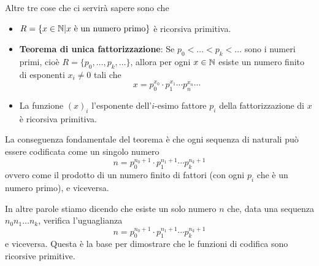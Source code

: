 Altre tre cose che ci servirà sapere sono che
\begin{itemize}
	\item $R = \{ x \in \mathbb{N} | x \text{ è un numero primo} \}$
	      è ricorsiva primitiva.
	\item \textbf{Teorema di unica fattorizzazione}: Se
	      $p_0 < \dots < p_k < \dots$ sono i numeri primi,
	      cioè $R = \{ p_0, \dots, p_k, \dots \}$, allora per
	      ogni $x \in \mathbb{N}$ esiste un numero finito di esponenti
	      $x_i \neq 0$ tali che
	      \[
		      x = p_0^{x_0} \cdot p_1^{x_1} \cdots
		      p_n^{x_n} \cdots
	      \]
	\item La funzione $(x)_i$ l'esponente dell'$i$-esimo
	      fattore $p_i$ della fattorizzazione di $x$ è
	      ricorsiva primitiva.
\end{itemize}
La conseguenza fondamentale del teorema è che ogni sequenza
di naturali può essere codificata come un singolo numero
\[
	n = p_0^{n_0 + 1} \cdot p_1^{n_1 + 1} \cdots
	p_k^{n_k + 1}
\]
ovvero come il prodotto di un numero finito di fattori (con
ogni $p_i$ che è un numero primo), e viceversa.

In altre parole stiamo dicendo che esiste un solo numero $n$
che, data una sequenza $n_0 n_1 \dots n_k$, verifica
l'uguaglianza
\[
	n = p_0^{n_0 + 1} \cdot p_1^{n_1 + 1} \cdots
	p_k^{n_k + 1}
\]
e viceversa. Questa è la base per dimostrare che le funzioni
di codifica sono ricorsive primitive.
